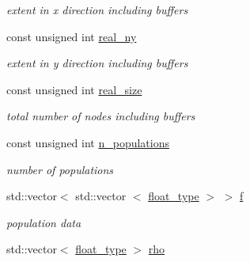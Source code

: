 \begin{DoxyCompactItemize}
\begin{DoxyCompactList}\small\item\em extent in x direction including buffers \end{DoxyCompactList}\item 
\hypertarget{classlb_1_1lattice_a14f6a89fbc2091ff648b63eec07e94df}{const unsigned int \hyperlink{classlb_1_1lattice_a14f6a89fbc2091ff648b63eec07e94df}{real\-\_\-ny}}\label{classlb_1_1lattice_a14f6a89fbc2091ff648b63eec07e94df}

\begin{DoxyCompactList}\small\item\em extent in y direction including buffers \end{DoxyCompactList}\item 
\hypertarget{classlb_1_1lattice_abd941986f68b36d63cc496c4a5ab0031}{const unsigned int \hyperlink{classlb_1_1lattice_abd941986f68b36d63cc496c4a5ab0031}{real\-\_\-size}}\label{classlb_1_1lattice_abd941986f68b36d63cc496c4a5ab0031}

\begin{DoxyCompactList}\small\item\em total number of nodes including buffers \end{DoxyCompactList}\item 
\hypertarget{classlb_1_1lattice_a8aa6f2484aa56a9629bb6332f1f5bb66}{const unsigned int \hyperlink{classlb_1_1lattice_a8aa6f2484aa56a9629bb6332f1f5bb66}{n\-\_\-populations}}\label{classlb_1_1lattice_a8aa6f2484aa56a9629bb6332f1f5bb66}

\begin{DoxyCompactList}\small\item\em number of populations \end{DoxyCompactList}\item 
\hypertarget{classlb_1_1lattice_aceb8c63dd715a674b6053a40eabf5a0e}{std\-::vector$<$ std\-::vector\*
$<$ \hyperlink{namespacelb_a2b37d1585aef2d3da421ad0aedc6b11b}{float\-\_\-type} $>$ $>$ \hyperlink{classlb_1_1lattice_aceb8c63dd715a674b6053a40eabf5a0e}{f}}\label{classlb_1_1lattice_aceb8c63dd715a674b6053a40eabf5a0e}

\begin{DoxyCompactList}\small\item\em population data \end{DoxyCompactList}\item 
\hypertarget{classlb_1_1lattice_af3c98b27e7932c6106c2895a21d8de6e}{std\-::vector$<$ \hyperlink{namespacelb_a2b37d1585aef2d3da421ad0aedc6b11b}{float\-\_\-type} $>$ \hyperlink{classlb_1_1lattice_af3c98b27e7932c6106c2895a21d8de6e}{rho}}\label{classlb_1_1lattice_af3c98b27e7932c6106c2895a21d8de6e}


\end{DoxyCompactItemize}
